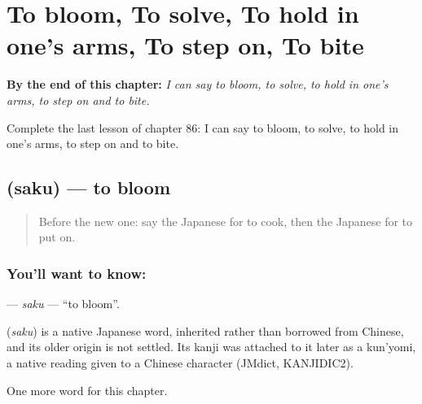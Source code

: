 
\chapter{To bloom, To solve, To hold in one's arms, To step on, To bite}
\label{ch:ja-to-bloom-to-solve-to-hold-in-one-s-arms-to-step-on-to-bite}

\begin{chapteropening}
\textbf{By the end of this chapter:} \emph{I can say to bloom, to solve, to hold in one's arms, to step on and to bite.}

Complete the last lesson of chapter 86: I can say to bloom, to solve, to hold in one's arms, to step on and to bite.
\end{chapteropening}

\section[\texorpdfstring{\ja{さく} (saku)}{さく (saku)}]{ (saku) — to bloom}

\label{lesson:JA-C86-saku}



\begin{quote}
Before the new one: say the Japanese for to cook, then the Japanese for to put on.
\end{quote}

\subsection*{You'll want to know: }
\textbf{} — \emph{saku} — \textquotedblleft{}to bloom\textquotedblright{}.

\begin{cousinweb}
\textbf{} (\emph{saku}) is a native Japanese word, inherited rather than borrowed from Chinese, and its older origin is not settled. Its kanji was attached to it later as a kun'yomi, a native reading given to a Chinese character (JMdict, KANJIDIC2).
\end{cousinweb}

\begin{grammarlens}[title={What you've built}]
One more word for this chapter.
\end{grammarlens}

